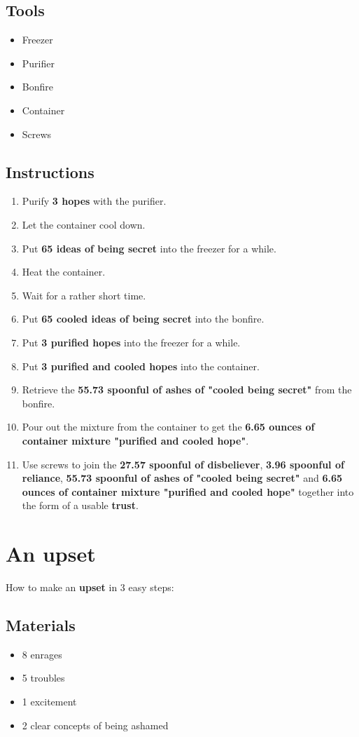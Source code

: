 \documentclass{article}
\begin{document}
\subsection{Tools}\begin{itemize}
\item 
Freezer
\item 
Purifier
\item 
Bonfire
\item 
Container
\item 
Screws
\end{itemize}
\subsection{Instructions}\begin{enumerate}
\item 
Purify \textbf{3 hopes} with the purifier.
\item 
Let the container cool down.
\item 
Put \textbf{65 ideas of being secret} into the freezer for a while.
\item 
Heat the container.
\item 
Wait for a rather short time.
\item 
Put \textbf{65 cooled ideas of being secret} into the bonfire.
\item 
Put \textbf{3 purified hopes} into the freezer for a while.
\item 
Put \textbf{3 purified and cooled hopes} into the container.
\item 
Retrieve the \textbf{55.73 spoonful of ashes of "cooled being secret"} from the bonfire.
\item 
Pour out the mixture from the container to get the \textbf{6.65 ounces of container mixture "purified and cooled hope"}.
\item 
Use screws to join the \textbf{27.57 spoonful of disbeliever}, \textbf{3.96 spoonful of reliance}, \textbf{55.73 spoonful of ashes of "cooled being secret"} and \textbf{6.65 ounces of container mixture "purified and cooled hope"} together into the form of a usable \textbf{trust}.
\end{enumerate}
\newpage
\section{An upset}How to make an \textbf{upset} in 3 easy steps:

\subsection{Materials}\begin{itemize}
\item 
8 enrages
\item 
5 troubles
\item 
1 excitement
\item 
2 clear concepts of being ashamed
\end{itemize}
\end{document}
